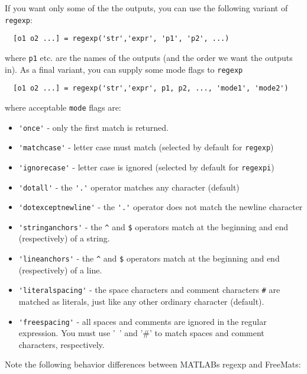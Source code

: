 If you want only some of the the outputs,  you can use the 
following variant of \verb|regexp|:
\begin{verbatim}
  [o1 o2 ...] = regexp('str','expr', 'p1', 'p2', ...)
\end{verbatim}
where \verb|p1| etc. are the names of the outputs (and the order we want
the outputs in).  As a final variant, you can supply some mode 
flags to \verb|regexp|
\begin{verbatim}
  [o1 o2 ...] = regexp('str','expr', p1, p2, ..., 'mode1', 'mode2')
\end{verbatim}
where acceptable \verb|mode| flags are:
\begin{itemize}
\item  \verb|'once'| - only the first match is returned.

\item  \verb|'matchcase'| - letter case must match (selected by default for \verb|regexp|)

\item  \verb|'ignorecase'| - letter case is ignored (selected by default for \verb|regexpi|)

\item  \verb|'dotall'| - the \verb|'.'| operator matches any character (default)

\item  \verb|'dotexceptnewline'| - the \verb|'.'| operator does not match the newline character

\item  \verb|'stringanchors'| - the \verb|^| and \verb|$| operators match at the beginning and 
end (respectively) of a string.

\item  \verb|'lineanchors'| - the \verb|^| and \verb|$| operators match at the beginning and
end (respectively) of a line.

\item  \verb|'literalspacing'| - the space characters and comment characters \verb|#| are matched
as literals, just like any other ordinary character (default).

\item  \verb|'freespacing'| - all spaces and comments are ignored in the regular expression.
You must use '\ ' and '\#' to match spaces and comment characters, respectively.

\end{itemize}
Note the following behavior differences between MATLABs regexp and FreeMats:
